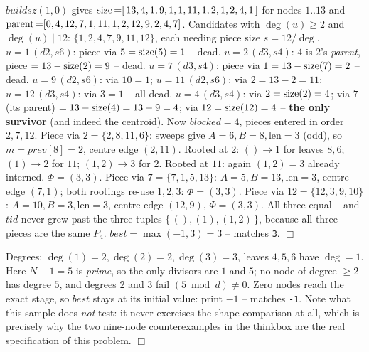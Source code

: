\begin{tracebox}[Sample 1: \(N{=}13\) -- the filter keeps exactly one node, and it is the centroid]
\(\mathit{buildsz}(1,0)\) gives \(\operatorname{size}{=}[\,13,4,1,9,1,1,11,1,2,1,2,4,1\,]\) for nodes
\(1..13\) and \(\operatorname{parent}{=}[0,4,12,7,1,11,1,2,12,9,2,4,7]\). Candidates with
\(\deg(u)\ge2\) and \(\deg(u)\mid 12\): \(\{1,2,4,7,9,11,12\}\), each needing piece size
\(s=12/\deg\).
\(u{=}1\,(d2,s6)\): piece via \(5=\operatorname{size}(5)=1\) -- dead.
\(u{=}2\,(d3,s4)\): \(4\) is \(2\)'s \emph{parent}, piece \(=13-\operatorname{size}(2)=9\) -- dead.
\(u{=}7\,(d3,s4)\): piece via \(1=13-\operatorname{size}(7)=2\) -- dead.
\(u{=}9\,(d2,s6)\): via \(10=1\); \(u{=}11\,(d2,s6)\): via \(2=13-2=11\);
\(u{=}12\,(d3,s4)\): via \(3=1\) -- all dead.
\(u{=}4\,(d3,s4)\): via \(2=\operatorname{size}(2)=4\); via \(7\) (its parent) \(=13-\operatorname{size}(4)=13-9=4\);
via \(12=\operatorname{size}(12)=4\) -- \textbf{the only survivor} (and indeed the centroid).
Now \(\mathit{blocked}=4\), pieces entered in order \(2,7,12\).
Piece via \(2=\{2,8,11,6\}\): sweeps give \(A{=}6,B{=}8,\text{len}=3\) (odd), so
\(m=\mathit{prev}[8]=2\), centre edge \((2,11)\). Rooted at \(2\):
\(()\!\to\!1\) for leaves \(8,6\); \((1)\!\to\!2\) for \(11\); \((1,2)\!\to\!3\) for \(2\).
Rooted at \(11\): again \((1,2)=3\) already interned. \(\Phi=(3,3)\).
Piece via \(7=\{7,1,5,13\}\): \(A{=}5,B{=}13,\text{len}=3\), centre edge \((7,1)\); both
rootings re-use \(1,2,3\): \(\Phi=(3,3)\).
Piece via \(12=\{12,3,9,10\}\): \(A{=}10,B{=}3,\text{len}=3\), centre edge \((12,9)\),
\(\Phi=(3,3)\). All three equal -- and \(\mathit{tid}\) never grew past the three tuples
\(\{\,(),(1),(1,2)\,\}\), because all three pieces are the same \(P_4\).
\(\mathit{best}=\max(-1,3)=\boxed{3}\) -- matches \texttt{3}. \(\Box\)
\end{tracebox}

\begin{tracebox}[Sample 2: \(N{=}6\) -- arithmetic alone closes the case]
Degrees: \(\deg(1)=2,\deg(2)=2,\deg(3)=3\), leaves \(4,5,6\) have \(\deg=1\). Here
\(N-1=5\) is \emph{prime}, so the only divisors are \(1\) and \(5\); no node of degree
\(\ge2\) has degree \(5\), and degrees \(2\) and \(3\) fail \((5\bmod d)\neq0\). Zero nodes
reach the exact stage, so \(\mathit{best}\) stays at its initial value: print
\(\boxed{-1}\) -- matches \texttt{-1}. Note what this sample does \emph{not} test: it never
exercises the shape comparison at all, which is precisely why the two nine-node
counterexamples in the thinkbox are the real specification of this problem. \(\Box\)
\end{tracebox}

